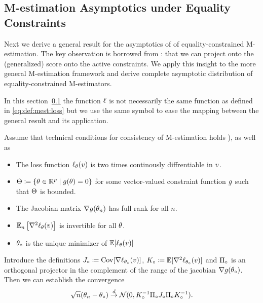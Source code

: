 \subsection{M-estimation Asymptotics under Equality Constraints}\label{subsection:mestimation_with_constraints}

Next we derive a general result for the asymptotics of of equality-constrained M-estimation. The key observation is borrowed from \citet{stoica_cramer-rao_1998}: that we can project onto the (generalized) score onto the active constraints. We apply this insight to the more general M-estimation framework and derive complete asymptotic distribution of equality-constrained M-estimators.

In this section~\ref{subsection:mestimation_with_constraints} the function $\ell$ is not necessarily the same function as defined in \eqref{eq:def:mest:loss} but we use the same symbol to ease the mapping between the general result and its application.

\begin{theorem} \label{thm:constrained_m_estimation}
    Assume that technical conditions for consistency of M-estimation holds \citep[Theorem 12.2]{wooldridge_econometric_2010}), as well as
    \begin{itemize}
        \item The loss function $\ell_\theta(v)$ is two times continously diffrentiable in $v$.
        \item $\Theta \coloneqq \{ \theta \in \mathbb R^p \mid g(\theta)=0\}$ for some vector-valued constraint function $g$ such that $\Theta $ is bounded.
        \item The Jacobian matrix $\nabla g( \theta_n)$ has full rank for all $n$.
        \item $\mathbb{E}_n \left[ \nabla^2 \ell_{\theta}(v)\right]$ is invertible for all $\theta$.
        \item $\theta_\circ$ is the unique minimizer of $ \mathbb{E}[\ell_\theta(v)]$
    \end{itemize}

    Introduce  the definitions
    $J_\circ \coloneqq \operatorname*{Cov}[\nabla \ell_{\theta_\circ}(v)]$,
    $K_\circ \coloneqq  \mathbb{E}[ \nabla^2 \ell_{\theta_\circ}(v)]$ and
    $\Pi_\circ$ is an orthogonal projector in the complement of the range of the jacobian $\nabla g( \theta_\circ)$.
    Then we can establish the convergence
    \[\sqrt{n} ( \theta_n - \theta_\circ) \overset{d}{\to} \mathcal N(0,K_\circ^{-1}\Pi_\circ J_\circ\Pi_\circ K_\circ^{-1}).\]
\end{theorem}

